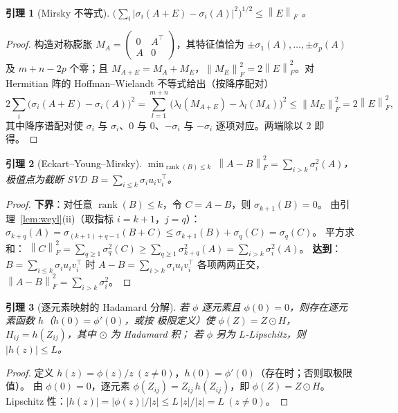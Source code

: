 \documentclass[UTF8,11pt,a4paper]{ctexart}
\theoremstyle{plain}
\newtheorem{lemma}{引理}
\theoremstyle{definition}
\theoremstyle{remark}
\newcommand{\rank}{\operatorname{rank}}
\newcommand{\Fnorm}[1]{\left\lVert #1\right\rVert_F}
\begin{document}
\begin{lemma}[Mirsky 不等式]\label{lem:mirsky}
$\big(\textstyle\sum_i|\sigma_i(A+E)-\sigma_i(A)|^2\big)^{1/2}\le\Fnorm{E}$
\cite{mirsky1960,wedin1972}。
\end{lemma}
\begin{proof}
构造对称膨胀 $M_A=\begin{pmatrix}0&A^\top\\ A&0\end{pmatrix}$，其特征值恰为
$\pm\sigma_1(A),\dots,\pm\sigma_p(A)$ 及 $m+n-2p$ 个零；且
$M_{A+E}=M_A+M_E$，$\Fnorm{M_E}^2=2\Fnorm{E}^2$。对 Hermitian 阵的
Hoffman--Wielandt 不等式给出（按降序配对）
\[
2\sum_i\big(\sigma_i(A+E)-\sigma_i(A)\big)^2
=\sum_{l=1}^{m+n}\big(\lambda_l(M_{A+E})-\lambda_l(M_A)\big)^2
\le\Fnorm{M_E}^2=2\Fnorm{E}^2,
\]
其中降序谱配对使 $\sigma_i$ 与 $\sigma_i$、$0$ 与 $0$、$-\sigma_i$ 与
$-\sigma_i$ 逐项对应。两端除以 $2$ 即得。
\end{proof}

\begin{lemma}[Eckart--Young--Mirsky]\label{lem:eym}
$\displaystyle\min_{\rank(B)\le k}\ \Fnorm{A-B}^2=\sum_{i>k}\sigma_i^2(A)$，
极值点为截断 SVD
$B=\sum_{i\le k}\sigma_iu_iv_i^\top$\cite{eckart1936,mirsky1960}。
\end{lemma}
\begin{proof}
\textbf{下界}：对任意 $\rank(B)\le k$，令 $C=A-B$，则 $\sigma_{k+1}(B)=0$。
由引理~\ref{lem:weyl}(ii)（取指标 $i=k+1$，$j=q$）：
$\sigma_{k+q}(A)=\sigma_{(k+1)+q-1}(B+C)\le\sigma_{k+1}(B)+\sigma_q(C)=\sigma_q(C)$。
平方求和：
$\Fnorm{C}^2=\sum_{q\ge1}\sigma_q^2(C)\ge\sum_{q\ge1}\sigma_{k+q}^2(A)
=\sum_{i>k}\sigma_i^2(A)$。
\textbf{达到}：$B=\sum_{i\le k}\sigma_iu_iv_i^\top$ 时
$A-B=\sum_{i>k}\sigma_iu_iv_i^\top$ 各项两两正交，
$\Fnorm{A-B}^2=\sum_{i>k}\sigma_i^2$。
\end{proof}

\begin{lemma}[逐元素映射的 Hadamard 分解]\label{lem:hadamard}
若 $\phi$ 逐元素且 $\phi(0)=0$，则存在逐元素函数 $h$（$h(0)=\phi'(0)$，或按
极限定义）使 $\phi(Z)=Z\odot H$，$H_{ij}=h(Z_{ij})$，其中 $\odot$ 为 Hadamard 积；
若 $\phi$ 另为 $L$-Lipschitz，则 $|h(z)|\le L$。
\end{lemma}
\begin{proof}
定义 $h(z)=\phi(z)/z\ (z\ne0)$，$h(0)=\phi'(0)$（存在时；否则取极限值）。
由 $\phi(0)=0$，逐元素 $\phi(Z_{ij})=Z_{ij}\,h(Z_{ij})$，即 $\phi(Z)=Z\odot H$。
Lipschitz 性：$|h(z)|=|\phi(z)|/|z|\le L\,|z|/|z|=L\ (z\ne0)$。
\end{proof}
\end{document}
